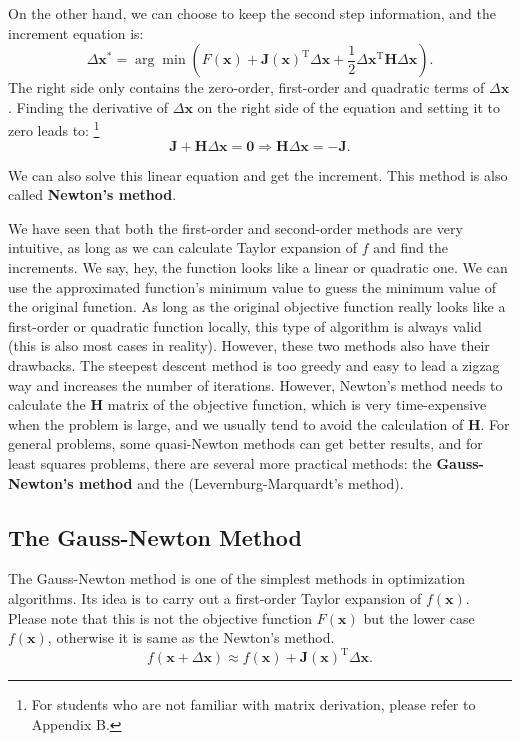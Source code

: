On the other hand, we can choose to keep the second step information, and the increment equation is:
\begin{equation}
    \Delta \bm{x}^* = \arg \min \left(F\left( \bm{x} \right) + \bm{J} \left( \bm{x} \right)^\mathrm{ T} \Delta \bm{x} + \frac{1}{2}\Delta {\bm{x}^\mathrm{T}}\bm{H} \Delta \bm{x} \right).
\end{equation}
The right side only contains the zero-order, first-order and quadratic terms of $\Delta \bm{x}$. Finding the derivative of $\Delta \bm{x}$ on the right side of the equation and setting it to zero leads to: \footnote{For students who are not familiar with matrix derivation, please refer to Appendix B. }
\begin{equation}
    \label{eq:newton-method}
    \bm{J} + \bm{H} \Delta \bm{x} = \bm{0} \Rightarrow
    \bm{H} \Delta \bm{x} = -\bm{J}.
\end{equation}

We can also solve this linear equation and get the increment. This method is also called \textbf{Newton's method}.

We have seen that both the first-order and second-order methods are very intuitive, as long as we can calculate Taylor expansion of $f$ and find the increments. We say, hey, the function looks like a linear or quadratic one. We can use the approximated function's minimum value to guess the minimum value of the original function. As long as the original objective function really looks like a first-order or quadratic function locally, this type of algorithm is always valid (this is also most cases in reality). However, these two methods also have their drawbacks. The steepest descent method is too greedy and easy to lead a zigzag way and increases the number of iterations. However, Newton's method needs to calculate the $\bm{H}$ matrix of the objective function, which is very time-expensive when the problem is large, and we usually tend to avoid the calculation of $\bm{H}$. For general problems, some quasi-Newton methods can get better results, and for least squares problems, there are several more practical methods: the \textbf{Gauss-Newton's method} and the (Levernburg-Marquardt's method).

\subsection{The Gauss-Newton Method}
The Gauss-Newton method is one of the simplest methods in optimization algorithms. Its idea is to carry out a first-order Taylor expansion of $f(\bm{x})$. Please note that this is not the objective function $F(\bm{x})$ but the lower case $f(\bm{x})$, otherwise it is same as the Newton's method.
\begin{equation}
    \label{eq:approximation}
    f\left( {\bm{x} + \Delta \bm{x}} \right) \approx f\left( \bm{x} \right) + \bm{J} \left( \bm{x} \right)^\mathrm{T} \Delta \bm{x}.
\end{equation}

